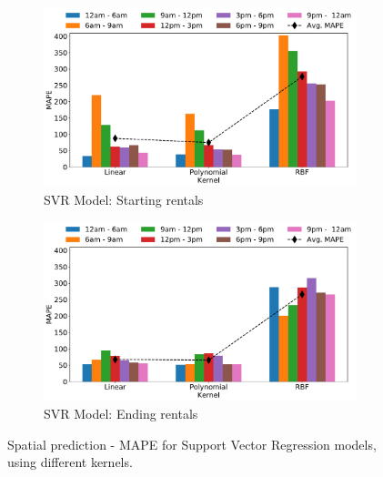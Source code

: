 \begin{figure}
    \begin{center}  
        \begin{subfigure}{0.65\textwidth}
            \includegraphics[width=\columnwidth]{figures/spatial_analyses/MAE_hist_svr_start_err_mean_perc.pdf}
            \caption{SVR Model: Starting rentals
            \vspace{0.5cm}}
            \label{fig:svr_start_MAPE}
        \end{subfigure}
         \begin{subfigure}{0.65\textwidth}
             \includegraphics[width=\columnwidth]{figures/spatial_analyses/MAE_hist_svr_final_err_mean_perc.pdf}
             \caption{SVR Model:  Ending rentals}
             \label{fig:svr_final_MAPE}
         \end{subfigure}
 	\caption{Spatial prediction - MAPE for Support Vector Regression models, using different kernels.}
    \label{fig:reg_MAPE}
    \end{center}
\end{figure}


